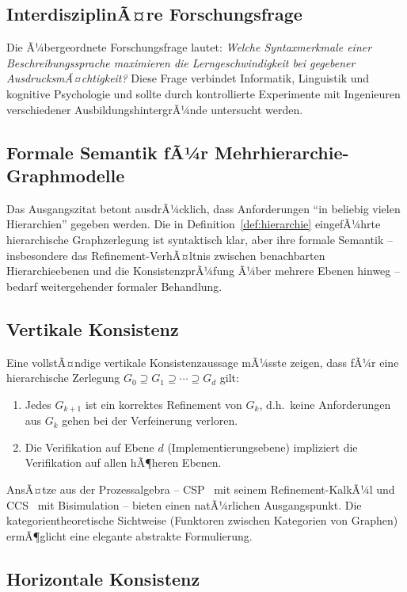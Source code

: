 ﻿\documentclass[a4paper,12pt]{report}
\theoremstyle{definition}
\begin{document}
\subsection{InterdisziplinÃ¤re Forschungsfrage}

Die Ã¼bergeordnete Forschungsfrage lautet: \emph{Welche Syntaxmerkmale einer
Beschreibungssprache maximieren die Lerngeschwindigkeit bei gegebener
AusdrucksmÃ¤chtigkeit?} Diese Frage verbindet Informatik, Linguistik und kognitive
Psychologie und sollte durch kontrollierte Experimente mit Ingenieuren verschiedener
AusbildungshintergrÃ¼nde untersucht werden.

\subsection{Formale Semantik fÃ¼r Mehrhierarchie-Graphmodelle}

Das Ausgangszitat betont ausdrÃ¼cklich, dass Anforderungen \enquote{in beliebig vielen
Hierarchien} gegeben werden. Die in Definition~\ref{def:hierarchie} eingefÃ¼hrte
hierarchische Graphzerlegung ist syntaktisch klar, aber ihre formale Semantik --
insbesondere das Refinement-VerhÃ¤ltnis zwischen benachbarten Hierarchieebenen und
die KonsistenzprÃ¼fung Ã¼ber mehrere Ebenen hinweg -- bedarf weitergehender formaler
Behandlung.

\subsection{Vertikale Konsistenz}

Eine vollstÃ¤ndige vertikale Konsistenzaussage mÃ¼sste zeigen, dass fÃ¼r eine hierarchische
Zerlegung $G_0 \supseteq G_1 \supseteq \cdots \supseteq G_d$ gilt:
\begin{enumerate}
  \item Jedes $G_{k+1}$ ist ein korrektes Refinement von $G_k$, d.h.\ keine Anforderungen
        aus $G_k$ gehen bei der Verfeinerung verloren.
  \item Die Verifikation auf Ebene $d$ (Implementierungsebene) impliziert die Verifikation
        auf allen hÃ¶heren Ebenen.
\end{enumerate}
AnsÃ¤tze aus der Prozessalgebra -- CSP~\cite{hoare1978} mit seinem Refinement-KalkÃ¼l
und CCS~\cite{milner1980} mit Bisimulation -- bieten einen natÃ¼rlichen Ausgangspunkt.
Die kategorientheoretische Sichtweise (Funktoren zwischen Kategorien von Graphen)
ermÃ¶glicht eine elegante abstrakte Formulierung.

\subsection{Horizontale Konsistenz}
\end{document}
